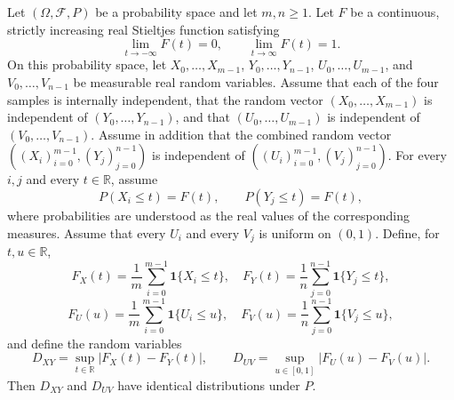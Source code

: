 \begin{theorem}
Let $(\Omega,\mathcal F,P)$ be a probability space and let $m,n\geq1$.  Let
$F$ be a continuous, strictly increasing real Stieltjes function satisfying
\[
  \lim_{t\to-\infty}F(t)=0,
  \qquad \lim_{t\to\infty}F(t)=1.
\]
On this probability space, let $X_0,\ldots,X_{m-1}$,
$Y_0,\ldots,Y_{n-1}$, $U_0,\ldots,U_{m-1}$, and
$V_0,\ldots,V_{n-1}$ be measurable real random variables.  Assume that each
of the four samples is internally independent, that the random vector
$(X_0,\ldots,X_{m-1})$ is independent of
$(Y_0,\ldots,Y_{n-1})$, and that $(U_0,\ldots,U_{m-1})$ is independent of
$(V_0,\ldots,V_{n-1})$.  Assume in addition that the combined random vector
$((X_i)_{i=0}^{m-1},(Y_j)_{j=0}^{n-1})$ is independent of
$((U_i)_{i=0}^{m-1},(V_j)_{j=0}^{n-1})$.
For every $i,j$ and every $t\in\mathbb R$, assume
\[
  P(X_i\leq t)=F(t),
  \qquad P(Y_j\leq t)=F(t),
\]
where probabilities are understood as the real values of the corresponding
measures.  Assume that every $U_i$ and every $V_j$ is uniform on $(0,1)$.
Define, for $t,u\in\mathbb R$,
\[
  F_X(t)=\frac1m\sum_{i=0}^{m-1}\mathbf 1\{X_i\leq t\},
  \quad
  F_Y(t)=\frac1n\sum_{j=0}^{n-1}\mathbf 1\{Y_j\leq t\},
\]
\[
  F_U(u)=\frac1m\sum_{i=0}^{m-1}\mathbf 1\{U_i\leq u\},
  \quad
  F_V(u)=\frac1n\sum_{j=0}^{n-1}\mathbf 1\{V_j\leq u\},
\]
and define the random variables
\[
  D_{XY}=\sup_{t\in\mathbb R}|F_X(t)-F_Y(t)|,
  \qquad
  D_{UV}=\sup_{u\in[0,1]}|F_U(u)-F_V(u)|.
\]
Then $D_{XY}$ and $D_{UV}$ have identical distributions under $P$.
\end{theorem}
